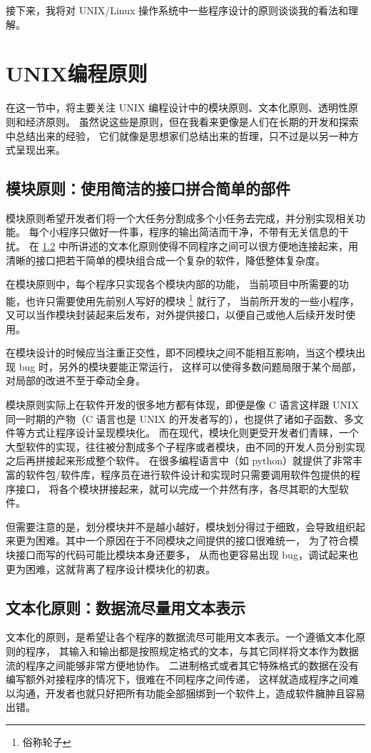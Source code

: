 \documentclass[UTF8]{ctexart}
\begin{document}
        接下来，我将对 UNIX/Linux 操作系统中一些程序设计的原则谈谈我的看法和理解。
    \section{UNIX编程原则}
        在这一节中，将主要关注 UNIX 编程设计中的模块原则、文本化原则、透明性原则和经济原则。
        虽然说这些是原则，但在我看来更像是人们在长期的开发和探索中总结出来的经验，
        它们就像是思想家们总结出来的哲理，只不过是以另一种方式呈现出来。
    \subsection{模块原则：使用简洁的接口拼合简单的部件}
        模块原则希望开发者们将一个大任务分割成多个小任务去完成，并分别实现相关功能。
        每个小程序只做好一件事，程序的输出简洁而干净，不带有无关信息的干扰。
        在 \ref{sec:text} 中所讲述的文本化原则使得不同程序之间可以很方便地连接起来，用清晰的接口把若干简单的模块组合成一个复杂的软件，降低整体复杂度。

        在模块原则中，每个程序只实现各个模块内部的功能，
        当前项目中所需要的功能，也许只需要使用先前别人写好的模块 \footnote{俗称轮子} 就行了，
        当前所开发的一些小程序，又可以当作模块封装起来后发布，对外提供接口，以便自己或他人后续开发时使用。

        在模块设计的时候应当注重正交性，即不同模块之间不能相互影响，当这个模块出现 bug 时，另外的模块要能正常运行，
        这样可以使得多数问题局限于某个局部，对局部的改进不至于牵动全身。

        模块原则实际上在软件开发的很多地方都有体现，即便是像 C 语言这样跟 UNIX 同一时期的产物（C 语言也是 UNIX 的开发者写的），也提供了诸如子函数、多文件等方式让程序设计呈现模块化。
        而在现代，模块化则更受开发者们青睐，一个大型软件的实现，往往被分割成多个子程序或者模块，由不同的开发人员分别实现之后再拼接起来形成整个软件。
        在很多编程语言中（如 python）就提供了非常丰富的软件包/软件库，程序员在进行软件设计和实现时只需要调用软件包提供的程序接口，
        将各个模块拼接起来，就可以完成一个井然有序，各尽其职的大型软件。

        但需要注意的是，划分模块并不是越小越好，模块划分得过于细致，会导致组织起来更为困难。其中一个原因在于不同模块之间提供的接口很难统一，
        为了符合模块接口而写的代码可能比模块本身还要多，
        从而也更容易出现 bug，调试起来也更为困难，这就背离了程序设计模块化的初衷。
    \subsection{文本化原则：数据流尽量用文本表示}\label{sec:text}
        文本化的原则，是希望让各个程序的数据流尽可能用文本表示。一个遵循文本化原则的程序，
        其输入和输出都是按照规定格式的文本，与其它同样将文本作为数据流的程序之间能够非常方便地协作。
        二进制格式或者其它特殊格式的数据在没有编写额外对接程序的情况下，很难在不同程序之间传递，
        这样就造成程序之间难以沟通，开发者也就只好把所有功能全部捆绑到一个软件上，造成软件臃肿且容易出错。
\end{document}
